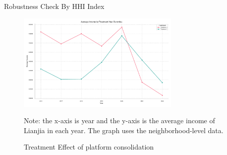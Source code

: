 \documentclass[11pt]{article}
\begin{document}
% 









\clearpage

\begin{table}[H]
  \begin{center}
    \begin{scriptsize}
    \caption{Robustness Check By HHI Index}
    \label{tab:dynamic_hhi}
      
  
    \end{scriptsize}
  \end{center}
\end{table}

\clearpage

%       
  

\begin{figure}
    \centering
    \includegraphics[width=0.7\textwidth]{../figures/average_income_by_treatment_platform.pdf}
    \caption{Treatment Effect of platform consolidation}
    \label{fig:treatment_consolidation}
    Note: the x-axis is year and the y-axis is the average income of Lianjia in each year. The graph uses the neighborhood-level data.
\end{figure}
\end{document}

